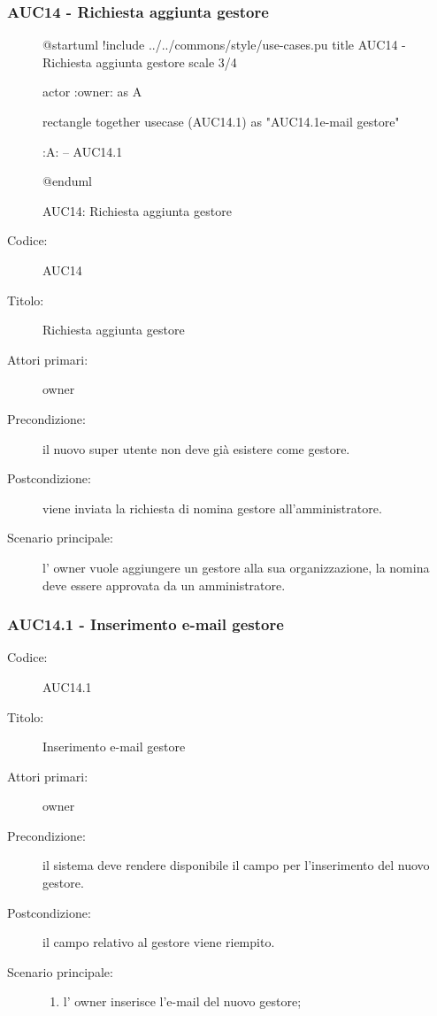 \documentclass[casi-duso]{subfiles}
\begin{document}
\subsubsection{AUC14 - Richiesta aggiunta gestore}%
\label{subsub:AUC14}

\begin{figure}[h!] 
  \centering 
  \begin{plantuml}
  @startuml
  !include ../../commons/style/use-cases.pu
  title AUC14 - Richiesta aggiunta gestore
  scale 3/4

  actor :owner: as A

  rectangle {
    together {
      usecase (AUC14.1) as "AUC14.1\nInserimento e-mail gestore"
    }
  }

  :A: -- AUC14.1

  @enduml
  \end{plantuml} 
  \caption{AUC14: Richiesta aggiunta gestore} 
  \label{fig:auc14} 
\end{figure}

\begin{description}
  \item[Codice:] AUC14
  \item[Titolo:] Richiesta aggiunta gestore
  \item[Attori primari:] owner
  \item[Precondizione:] il nuovo super utente non deve già esistere come gestore.
  \item[Postcondizione:] viene inviata la richiesta di nomina gestore all'amministratore.
  \item[Scenario principale:] l' owner vuole aggiungere un gestore alla sua organizzazione, la nomina deve essere approvata da un 
  amministratore.
\end{description}

\subsubsection{AUC14.1 - Inserimento e-mail gestore}%
\label{subsub:AUC14.1}
\begin{description}
  \item[Codice:] AUC14.1
  \item[Titolo:] Inserimento e-mail gestore
  \item[Attori primari:] owner
  \item[Precondizione:] il sistema deve rendere disponibile il campo per l'inserimento del nuovo gestore.
  \item[Postcondizione:] il campo relativo al gestore viene riempito.
  \item[Scenario principale:] 
  \begin{enumerate}
    \item l' owner inserisce l'e-mail del nuovo gestore;
  \end{enumerate}
\end{description}

\end{document}
